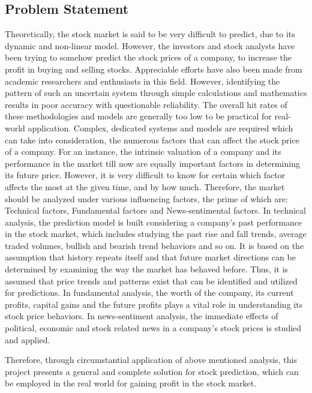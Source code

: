 \subsection{Problem Statement}
Theoretically, the stock market is said to be very difficult to predict, due to its dynamic and non-linear model. However, the investors and stock analysts have been trying to somehow predict the stock prices of a company, to increase the profit in buying and selling stocks. Appreciable efforts have also been made from academic researchers and enthusiasts in this field. However, identifying the pattern of such an uncertain system through simple calculations and mathematics results in poor accuracy with questionable reliability. The overall hit rates of these methodologies and models are generally too low to be practical for real-world application. Complex, dedicated systems and models are required which can take into consideration, the numerous factors that can affect the stock price of a company. For an instance, the intrinsic valuation of a company and its performance in the market till now are equally important factors in determining its future price. However, it is very difficult to know for certain which factor affects the most at the given time, and by how much. Therefore, the market should be analyzed under various influencing factors, the prime of which are: Technical factors, Fundamental factors and News-sentimental factors. In technical analysis, the prediction model is built considering a company's past performance in the stock market, which includes studying the past rise and fall trends, average traded volumes, bullish and bearish trend behaviors and so on. It is based on the assumption that history repeats itself and that future market directions can be determined by examining the way the market has behaved before. Thus, it is assumed that price trends and patterns exist that can be identified and utilized for predictions. In fundamental analysis, the worth of the company, its current profits, capital gains and the future profits plays a vital role in understanding its stock price behaviors. In news-sentiment analysis, the immediate effects of political, economic and stock related news in a company's stock prices is studied and applied.

Therefore, through circumstantial application of above mentioned analysis, this project presents a general and complete solution for stock prediction, which can be employed in the real world for gaining profit in the stock market.


